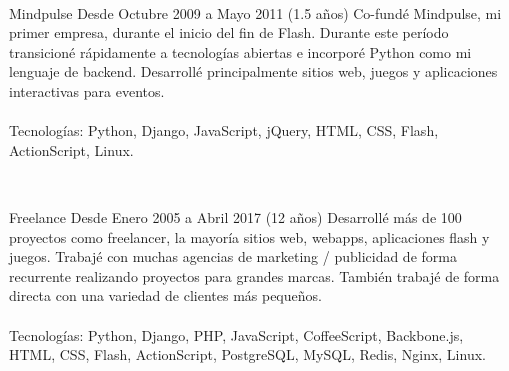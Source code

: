 \begin{enumerate}[leftmargin=0.8cm]
{\begin{itemize}[leftmargin=0.2cm]
      ~

      {Mindpulse}
      {Desde Octubre 2009 a Mayo 2011 (1.5 años)}
      {
        Co-fundé Mindpulse, mi primer empresa, durante el inicio del fin de Flash. Durante este período transicioné rápidamente a tecnologías abiertas e incorporé Python como mi lenguaje de backend. Desarrollé principalmente sitios web, juegos y aplicaciones interactivas para eventos.
        \\ \\ Tecnologías: Python, Django, JavaScript, jQuery, HTML, CSS, Flash, ActionScript, Linux.
      }

      ~

      {Freelance}
      {Desde Enero 2005 a Abril 2017 (12 años)}
      {
        Desarrollé más de 100 proyectos como freelancer, la mayoría sitios web, webapps, aplicaciones flash y juegos.
        Trabajé con muchas agencias de marketing / publicidad de forma recurrente realizando proyectos para grandes marcas.
        También trabajé de forma directa con una variedad de clientes más pequeños.
        \\ \\ Tecnologías: Python, Django, PHP, JavaScript, CoffeeScript, Backbone.js, HTML, CSS, Flash, ActionScript, PostgreSQL, MySQL, Redis, Nginx, Linux.
      }

    \end{itemize}

  }

\end{enumerate}
